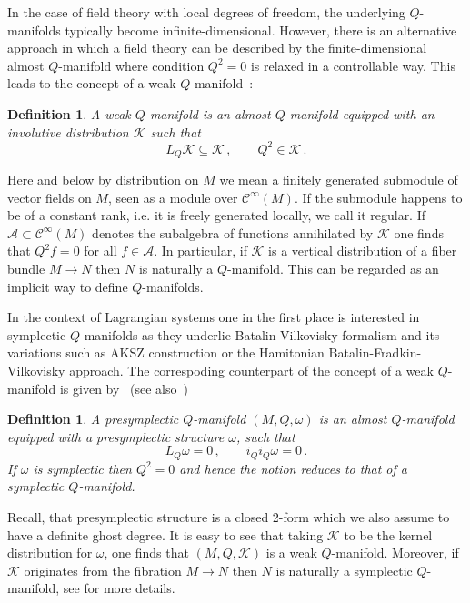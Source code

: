 \documentclass[a4paper,12pt]{article}
\numberwithin{equation}{section} %
\newtheorem{definition}[thm]{Definition}
\newcommand{\algA}{\mathcal{A}}
\newcommand{\cC}{\mathcal{C}}
\def\cK{\mathcal{K}}
\begin{document}
In the case of field theory with local degrees of freedom, the underlying $Q$-manifolds typically become infinite-dimensional. However, there is an alternative approach in which a field theory can be described by
the finite-dimensional almost $Q$-manifold where condition $Q^2=0$ is relaxed in a controllable way. This leads to the concept of a weak $Q$ manifold~\cite{Grigoriev:2024ncm}:
\begin{definition}
A weak $Q$-manifold is an almost $Q$-manifold equipped with an involutive distribution $\cK$ such that
\begin{equation}
    L_Q\cK \subseteq \cK\,, \qquad Q^2\in \cK\,.
\end{equation}
\end{definition}
Here and below by distribution on $M$ we mean a finitely generated submodule of vector fields on $M$, seen as a module over $\cC^\infty(M)$. If the submodule happens to be of a constant rank, i.e. it is freely generated locally, we call it regular. If $\algA\subset \cC^\infty(M)$ denotes the subalgebra of functions annihilated by $\cK$ one finds that $Q^2f=0$ for all $f\in\algA$. In particular, if $\cK$ is a vertical distribution of a fiber bundle $M\to N$ then $N$ is naturally a $Q$-manifold. This can be regarded as an implicit way to define $Q$-manifolds. 

In the context of Lagrangian systems one in the first place is interested in symplectic $Q$-manifolds as they underlie Batalin-Vilkovisky formalism and its variations such as AKSZ construction or the Hamitonian Batalin-Fradkin-Vilkovisky approach. The correspoding counterpart of the concept of a weak $Q$-manifold is given by~\cite{Grigoriev:2022zlq} (see also~\cite{Dneprov:2024cvt})
\begin{definition}
A presymplectic $Q$-manifold $(M,Q,\omega)$ is an almost $Q$-manifold equipped with a presymplectic structure $\omega$, such that
\begin{equation}
    L_Q\omega=0\,, \qquad i_Qi_Q\omega=0\,.
\end{equation}
If $\omega$ is symplectic then $Q^2=0$ and hence the notion reduces to that of a symplectic $Q$-manifold. 
\end{definition}
Recall, that presymplectic structure is a closed 2-form which we also assume to have a definite ghost degree.
It is easy to see that taking $\cK$ to be the kernel distribution for $\omega$, one finds that $(M,Q,\cK)$ is a weak $Q$-manifold. Moreover, if $\cK$ originates from the fibration $M\to N$ then $N$ is naturally a symplectic $Q$-manifold, see \cite{Grigoriev:2020xec, Dneprov:2024cvt,Grigoriev:2024ncm} for more details.  
\end{document}
